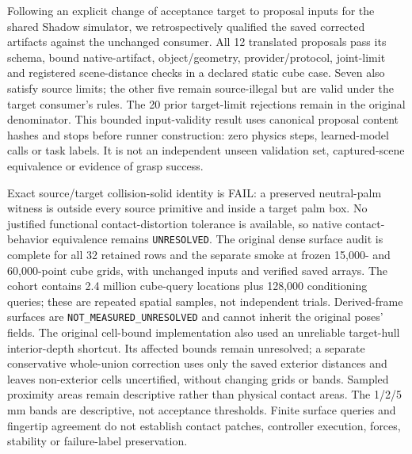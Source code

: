 \documentclass[10pt,letterpaper]{article}
\begin{document}
Following an explicit change of acceptance target to proposal inputs for the
shared Shadow simulator, we retrospectively qualified the saved corrected
artifacts against the unchanged consumer. All 12 translated proposals pass its
schema, bound native-artifact, object/geometry, provider/protocol, joint-limit
and registered scene-distance checks in a declared static cube case. Seven
also satisfy source limits; the other five remain source-illegal but are valid
under the target consumer's rules. The 20 prior target-limit rejections remain
in the original denominator. This bounded input-validity result uses canonical
proposal content hashes and stops before runner construction: zero physics
steps, learned-model calls or task labels. It is not an independent unseen
validation set, captured-scene equivalence or evidence of grasp success.

Exact source/target collision-solid identity is FAIL: a preserved neutral-palm
witness is outside every source primitive and inside a target palm box. No
justified functional contact-distortion tolerance is available, so native
contact-behavior equivalence remains \texttt{UNRESOLVED}. The original dense surface
audit is complete for all 32 retained rows and the separate smoke at frozen
15,000- and 60,000-point cube grids, with unchanged inputs and verified saved
arrays. The cohort contains 2.4 million cube-query locations plus 128,000
conditioning queries; these are repeated spatial samples, not independent trials. Derived-frame surfaces are
\texttt{NOT\_MEASURED\_UNRESOLVED} and cannot inherit the original poses' fields.
The original cell-bound implementation also used an unreliable target-hull
interior-depth shortcut. Its affected bounds remain unresolved; a separate
conservative whole-union correction uses only the saved exterior distances
and leaves non-exterior cells uncertified, without changing grids or bands.
Sampled proximity areas remain descriptive rather than physical contact areas.
The 1/2/5 mm bands are descriptive, not acceptance thresholds. Finite surface
queries and fingertip agreement do not establish contact patches, controller
execution, forces, stability or failure-label preservation.
\end{document}
